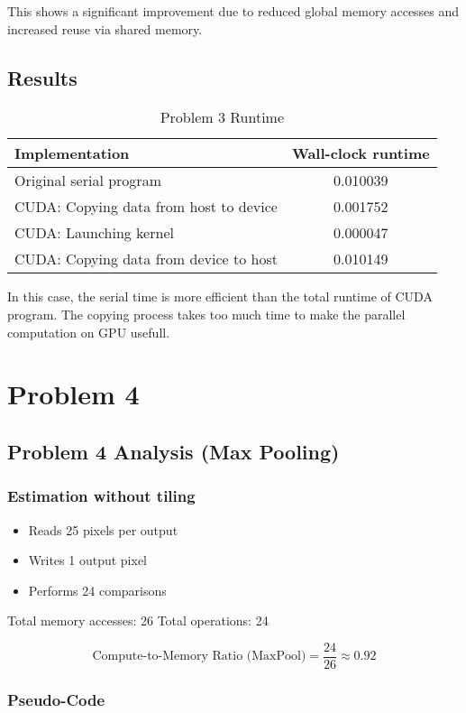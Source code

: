 \documentclass[11pt]{article}
\begin{document}
This shows a significant improvement due to reduced global memory accesses and increased reuse via shared memory.
\subsection{Results}
\label{sec:orgc503630}

\begin{table}[htbp]
\caption{Problem 3 Runtime}
\centering
\begin{tabular}{|l|c|}
\hline
Implementation & Wall-clock runtime\\
\hline
Original serial program & 0.010039\\
\hline
CUDA: Copying data from host to device & 0.001752\\
\hline
CUDA: Launching kernel & 0.000047\\
\hline
CUDA: Copying data from device to host & 0.010149\\
\hline
\end{tabular}
\end{table}

In this case, the serial time is more efficient than the total runtime of CUDA program. The copying process takes too much time to make the parallel computation on GPU usefull.
\newpage
\section{Problem 4}
\label{sec:orgeb40c10}
\subsection{Problem 4 Analysis (Max Pooling)}
\label{sec:org8d38712}
\subsubsection{Estimation without tiling}
\label{sec:org4aa8196}

\begin{itemize}
\item Reads 25 pixels per output
\item Writes 1 output pixel
\item Performs 24 comparisons
\end{itemize}

Total memory accesses: 26  
Total operations: 24

\[
\text{Compute-to-Memory Ratio (MaxPool)} = \frac{24}{26} \approx 0.92
\]
\subsubsection{Pseudo-Code}
\label{sec:org8763f23}
\end{document}
